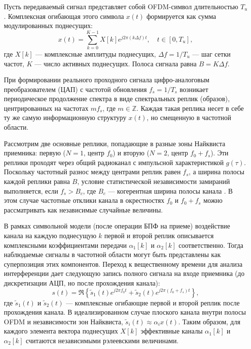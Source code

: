 \documentclass[a4paper,12pt]{article}
\numberwithin{equation}{section}
\begin{document}
Пусть передаваемый сигнал представляет собой OFDM-символ длительностью $T_u$. Комплексная огибающая этого символа $x(t)$ формируется как сумма модулированных поднесущих:
\begin{equation}
x(t) = \sum_{k=0}^{K-1} X[k] e^{j 2 \pi (k \Delta f) t}, \quad t \in [0, T_u],
\label{eq:ofdm_baseband}
\end{equation}
где $X[k]$ — комплексные амплитуды поднесущих, $\Delta f = 1/T_u$ — шаг сетки частот, $K$ — число активных поднесущих. Полоса сигнала равна $B = K \Delta f$.

При формировании реального проходного сигнала цифро-аналоговым преобразователем (ЦАП) с частотой обновления $f_s = 1/T_s$ возникает периодическое продолжение спектра в виде спектральных реплик (образов), центрированных на частотах $m f_s$, где $m \in \mathbb{Z}$. Каждая такая реплика несет в себе ту же самую информационную структуру $x(t)$, но смещенную в частотной области.

Рассмотрим две основные реплики, попадающие в разные зоны Найквиста приемника: первую ($N=1$, центр $f_0$) и вторую ($N=2$, центр $f_0 + f_s$). Эти реплики проходят через общий радиоканал с импульсной характеристикой $g(\tau)$. Поскольку частотный разнос между центрами реплик равен $f_s$, а ширина полосы каждой реплики равна $B$, условие статистической независимости замираний выполняется, если $f_s > B_c$, где $B_c$ — когерентная ширина полосы канала \cite{goldsmith}. В этом случае частотные отклики канала в окрестностях $f_0$ и $f_0+f_s$ можно рассматривать как независимые случайные величины.

В рамках символьной модели (после операции БПФ на приеме) воздействие канала на каждую поднесущую $k$ первой и второй реплик описывается комплексными коэффициентами передачи $\alpha_1[k]$ и $\alpha_2[k]$ соответственно. Тогда наблюдаемые сигналы в частотной области могут быть представлены как суперпозиция этих компонентов. Переход к вещественному времени для анализа интерференции дает следующую запись полного сигнала на входе приемника (до дискретизации АЦП, но после прохождения канала):
\begin{equation}
s(t) = \Re \left\{ \tilde{s}_1(t) e^{j 2 \pi f_0 t} + \tilde{s}_2(t) e^{j 2 \pi (f_0 + f_s) t} \right\},
\label{eq:real_signal}
\end{equation}
где $\tilde{s}_1(t)$ и $\tilde{s}_2(t)$ — комплексные огибающие первой и второй реплик после прохождения канала. В идеализированном случае плоского канала внутри полосы OFDM и независимости зон Найквиста, $\tilde{s}_i(t) \approx \alpha_i x(t)$. Таким образом, для каждого элемента вектора поднесущих $X[k]$ эффективные каналы $\alpha_1[k]$ и $\alpha_2[k]$ считаются независимыми рэлеевскими величинами.
\end{document}
